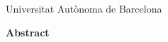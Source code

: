 \documentclass[a4paper,11pt,english,oneside,onecolumn,final,openany]{report}
\begin{document}
\vfill{}
{\par\centering Universitat Autònoma de Barcelona \par}


\newpage
\pagestyle{empty}
\begin{center}
\vspace*{3.5cm}
{\LARGE \bfseries  Abstract}
\end{center}
\vspace{0.5cm}
\begin{center} 
\begin{minipage}{5.5in}
\begin{center} \vrule width 4.5in height 0.4pt \end{center} 
\parindent=0pt 

\begin{center} \vrule width 4.5in height 0.4pt \end{center} 
\end{minipage} 
\end{center}



\tableofcontents

%

\newpage
{}
\pagestyle{fancy}









%

%


{\footnotesize


}


\addappheadtotoc
\appendixpage


\end{document}
